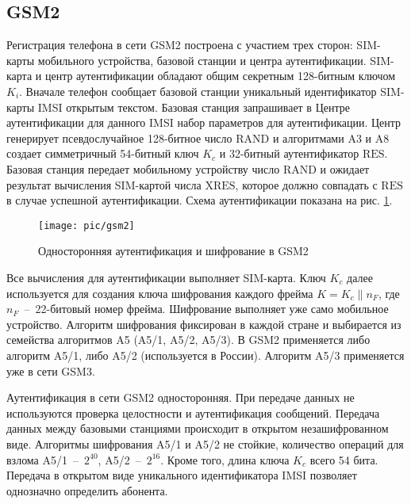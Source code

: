 \subsection{GSM2}

Регистрация телефона в сети GSM2 построена с участием трех сторон: SIM-карты мобильного устройства, базовой станции и центра аутентификации. SIM-карта и центр аутентификации обладают общим секретным 128-битным ключом $K_i$. Вначале телефон сообщает базовой станции уникальный идентификатор SIM-карты IMSI открытым текстом. Базовая станция запрашивает в Центре аутентификации для данного IMSI набор параметров для аутентификации. Центр генерирует псевдослучайное 128-битное число $\textrm{RAND}$ и алгоритмами A3 и A8 создает симметричный 54-битный ключ $K_c$ и 32-битный аутентификатор $\textrm{RES}$. Базовая станция передает мобильному устройству число $\textrm{RAND}$ и ожидает результат вычисления SIM-картой числа $\textrm{XRES}$, которое должно совпадать с $\textrm{RES}$ в случае успешной аутентификации. Схема аутентификации показана на рис. \ref{fig:gsm2}.

\begin{figure}[!ht]
	\centering
	\texttt{[image: pic/gsm2]}
	\caption{Односторонняя аутентификация и шифрование в GSM2\label{fig:gsm2}}
\end{figure}

Все вычисления для аутентификации выполняет SIM-карта. Ключ $K_c$ далее используется для создания ключа шифрования каждого фрейма $K = K_c \| n_F$, где $n_F$~--~22-битовый номер фрейма. Шифрование выполняет уже само мобильное устройство. Алгоритм шифрования фиксирован в каждой стране и выбирается из семейства алгоритмов A5 (A5/1, A5/2, A5/3). В GSM2 применяется либо алгоритм A5/1, либо A5/2 (используется в России). Алгоритм A5/3 применяется уже в сети GSM3.

Аутентификация в сети GSM2 односторонняя. При передаче данных не используются проверка целостности и аутентификация сообщений. Передача данных между базовыми станциями происходит в открытом незашифрованном виде. Алгоритмы шифрования A5/1 и A5/2 не стойкие, количество операций для взлома A5/1~--~$2^{40}$, A5/2~--~$2^{16}$. Кроме того, длина ключа $K_c$ всего 54 бита. Передача в открытом виде уникального идентификатора IMSI позволяет однозначно определить абонента.

